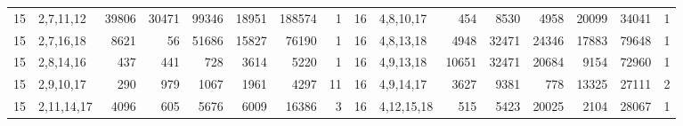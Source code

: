 \begin{table}[tp]
\begin{ruledtabular}
\begin{tabular}{rlrrrrrr@{\hspace{2.2em}}rlrrrrrr}
15 & 2,7,11,12 & 39806 & 30471 & 99346 & 18951 & 188574 & 1 & 16 & 4,8,10,17 & 454 & 8530 & 4958 & 20099 & 34041 & 1 \\
15 & 2,7,16,18 & 8621 & 56 & 51686 & 15827 & 76190 & 1 & 16 & 4,8,13,18 & 4948 & 32471 & 24346 & 17883 & 79648 & 1 \\
15 & 2,8,14,16 & 437 & 441 & 728 & 3614 & 5220 & 1 & 16 & 4,9,13,18 & 10651 & 32471 & 20684 & 9154 & 72960 & 1 \\
15 & 2,9,10,17 & 290 & 979 & 1067 & 1961 & 4297 & 11 & 16 & 4,9,14,17 & 3627 & 9381 & 778 & 13325 & 27111 & 2 \\
15 & 2,11,14,17 & 4096 & 605 & 5676 & 6009 & 16386 & 3 & 16 & 4,12,15,18 & 515 & 5423 & 20025 & 2104 & 28067 & 1 \\
\end{tabular}
\end{ruledtabular}
\end{table}

